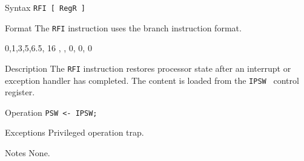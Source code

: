 %
%
\pagebreak
{}

\begin{iPageDescEntry}{Syntax}
    \texttt{RFI [ RegR ]}
\end{iPageDescEntry}

\begin{iPageDescEntry}{Format}
    The \texttt{RFI} instruction uses the branch instruction format. \\

    \begin{flushleft}
    \drawInstrFormat
        {0,1,3,5,6.5, 16}
        {\OpCodeGrpSYS, \OpCodeRFI, 0, 0, 0 }
    \end{flushleft}
\end{iPageDescEntry}

\begin{iPageDescEntry}{Description}
    The \texttt{RFI} instruction restores processor state after an interrupt
    or exception handler has completed. The content is loaded from the \texttt{IPSW} 
    control register.
\end{iPageDescEntry}

\begin{iPageDescEntry}{Operation}
    \texttt{PSW <- IPSW;} 
\end{iPageDescEntry}

\begin{iPageDescEntry}{Exceptions}
    Privileged operation trap.
\end{iPageDescEntry}

\begin{iPageDescEntry}{Notes}
   None.
\end{iPageDescEntry}

